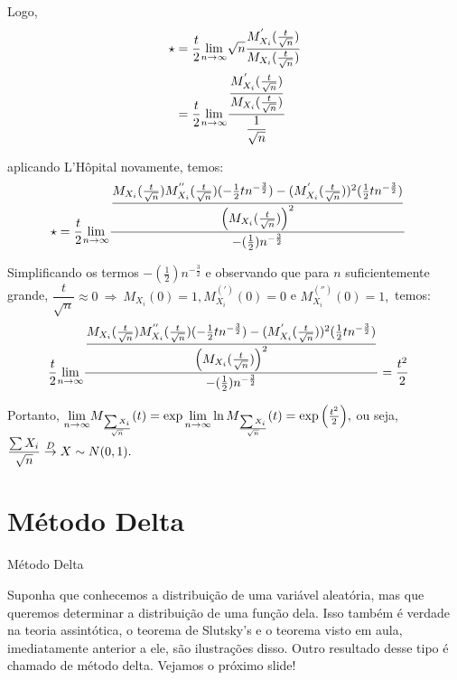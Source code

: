 \documentclass[12pt]{beamer}
\begin{document}
\begin{frame}{}
	\begin{block}{}
		\justifying
		Logo,
		\begin{align*}
		\star&=\dfrac{t}{2}{\displaystyle \lim_{n\to\infty}} \sqrt{n}\dfrac{M_{X_{i}}^{'}(\frac{t}{\sqrt{n}})}{M_{X_{i}}(\frac{t}{\sqrt{n}})}\\
		&= \dfrac{t}{2}{\displaystyle \lim_{n\to\infty}} \dfrac{\dfrac{M_{X_{i}}^{'}(\frac{t}{\sqrt{n}})}{M_{X_{i}}(\frac{t}{\sqrt{n}})}}{\dfrac{1}{\sqrt{n}}}
		\end{align*}
	\end{block}
	\pause
	\begin{block}{}
		\justifying
		aplicando L'Hôpital novamente, temos:
		\begin{align*}
 \star&=\dfrac{t}{2}{\displaystyle \lim_{n\to\infty}}
 \dfrac{\dfrac{M_{X_{i}}(\frac{t}{\sqrt{n}})M_{X_{i}}^{''}(\frac{t}{\sqrt{n}})(-\frac{1}{2}tn^{-\frac{3}{2}})-(M_{X_{i}}^{'}(\frac{t}{\sqrt{n}}))^{2}(\frac{1}{2}tn^{-\frac{3}{2}})}{\left(M_{X_{i}}(\frac{t}{\sqrt{n}})\right)^{2}}}{-(\frac{1}{2})n^{-\frac{3}{2}}}
		\end{align*} 
	\end{block}
\end{frame}

\begin{frame}{}
	\begin{block}{}
		\justifying
		Simplificando os termos $-(\frac{1}{2})n^{-\frac{3}{2}}$ e observando que para $n$ suficientemente grande, $\dfrac{t}{\sqrt{n}}\approx 0~\Rightarrow ~ M_{X_{i}}(0)=1,  M_{X_{i}}^{(')}(0)=0$ e $M_{X_{i}}^{('')}(0)=1,$ temos: 
		\begin{align*}
		\dfrac{t}{2}{\displaystyle \lim_{n\to\infty}}	\dfrac{\dfrac{M_{X_{i}}(\frac{t}{\sqrt{n}})M_{X_{i}}^{''}(\frac{t}{\sqrt{n}})(-\frac{1}{2}tn^{-\frac{3}{2}})-(M_{X_{i}}^{'}(\frac{t}{\sqrt{n}}))^{2}(\frac{1}{2}tn^{-\frac{3}{2}})}{\left(M_{X_{i}}(\frac{t}{\sqrt{n}})\right)^{2}}}{-(\frac{1}{2})n^{-\frac{3}{2}}}&=\dfrac{t^{2}}{2}
		\end{align*}
	\end{block}
\pause
\begin{block}{}
Portanto, ${\displaystyle \lim_{n\to\infty}} M_{\frac{\sum X_{i}}{\sqrt{n}}}(t)=\exp{{\displaystyle \lim_{n\to\infty}}\ln{M_{\frac{\sum X_{i}}{\sqrt{n}}}(t)}}=\exp{\left(\frac{t^{2}}{2}\right)},$ ou seja, $\dfrac{\sum X_{i}}{\sqrt{n}}\overset{D}{\rightarrow} X\sim N(0,1).$
\end{block}
\end{frame}

\section{Método Delta}
\begin{frame}{Método Delta}
\begin{block}{}
\justifying
Suponha que conhecemos a distribuição de uma variável aleatória, mas que queremos determinar a distribuição de uma função dela. Isso também é verdade na teoria assintótica, o teorema de Slutsky's e o teorema visto em aula, imediatamente anterior a ele, são ilustrações disso. Outro resultado desse tipo é chamado de método delta. Vejamos o próximo slide!
\end{block}
\end{frame}
\end{document}
